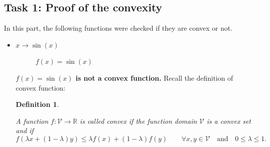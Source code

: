 \documentclass[paper=a4, fontsize=11pt]{scrartcl} %
\numberwithin{equation}{section} %
\numberwithin{figure}{section} %
\numberwithin{table}{section} %
\newtheorem{definition}{Definition}
\begin{document}
\subsection{Task 1: Proof of the convexity}

In this part, the following functions were checked if they are convex or not. 

\begin{itemize}
	\item $x \rightarrow \sin(x)$

\begin{figure}[H]
\vspace{-5mm}
\caption{$f(x) = \sin(x)$\label{fig:sinx}}
\centering
\noindent{}
\end{figure}
\textbf{$f(x) = \sin(x)$ is not a convex function.} Recall the definition of convex function: \\

\begin{definition} \label{def:convex}

A function $f: \mathcal{V} \rightarrow \mathbb{R}$ is called \textit{convex} if the function domain $\mathcal{V}$ is a convex set and if 
\begin{equation*}
	f(\lambda x + (1 - \lambda)y) \leq \lambda f(x) + (1 - \lambda) f(y) \qquad \forall x, y \in \mathcal{V} \quad \text{and} \quad 0 \leq \lambda \leq 1.
\end{equation*} 	
\end{definition}


\end{itemize}
\end{document}
